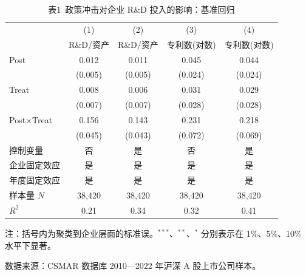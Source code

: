 \documentclass[11pt]{article}
\begin{document}
\begin{table}[!htbp]
  \centering
  \caption{表1\ 政策冲击对企业 R\&D 投入的影响：基准回归}
  \label{tab:main}
  \begin{threeparttable}
  \begin{tabular}{l*{4}{c}}
    \toprule
                        & (1)         & (2)         & (3)         & (4)         \\
                        & R\&D/资产   & R\&D/资产   & 专利数(对数) & 专利数(对数) \\
    \midrule
    Post                & 0.012\sym{**}  & 0.011\sym{**}  & 0.045\sym{*}   & 0.044\sym{*}   \\
                        & (0.005)     & (0.005)     & (0.024)     & (0.024)     \\
    Treat               & 0.008       & 0.006       & 0.031       & 0.029       \\
                        & (0.007)     & (0.007)     & (0.028)     & (0.028)     \\
    Post$\times$Treat   & 0.156\sym{***} & 0.143\sym{***} & 0.231\sym{***} & 0.218\sym{***} \\
                        & (0.045)     & (0.043)     & (0.072)     & (0.069)     \\
    \midrule
    控制变量            & 否          & 是          & 否          & 是          \\
    企业固定效应        & 是          & 是          & 是          & 是          \\
    年度固定效应        & 是          & 是          & 是          & 是          \\
    样本量 $N$          & 38{,}420    & 38{,}420    & 38{,}420    & 38{,}420    \\
    $R^{2}$             & 0.21        & 0.34        & 0.32        & 0.41        \\
    \bottomrule
  \end{tabular}
  \begin{tablenotes}\footnotesize
    \item 注：括号内为聚类到企业层面的标准误。$^{***}$、$^{**}$、$^{*}$ 分别表示在 1\%、5\%、10\% 水平下显著。
    \item 数据来源：CSMAR 数据库 2010—2022 年沪深 A 股上市公司样本。
  \end{tablenotes}
  \end{threeparttable}
\end{table}
\end{document}
